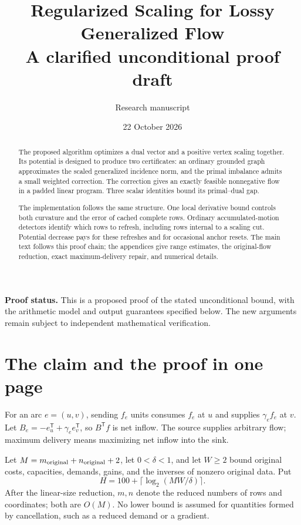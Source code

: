 \documentclass[11pt]{article}
\title{Regularized Scaling for Lossy Generalized Flow\\
\large A clarified unconditional proof draft}
\author{Research manuscript}
\date{22 October 2026}
\theoremstyle{definition}\newtheorem{definition}[theorem]{Definition}
\theoremstyle{remark}\newtheorem{remark}[theorem]{Remark}
\begin{document}
\maketitle
\begin{abstract}
The proposed algorithm optimizes a dual vector and a positive vertex
scaling together. Its potential is designed to produce two certificates:
an ordinary grounded graph approximates the scaled generalized incidence
norm, and the primal imbalance admits a small weighted correction.
The correction gives an exactly feasible nonnegative flow in a padded
linear program. Three scalar identities bound its primal--dual gap.

The implementation follows the same structure. One local derivative
bound controls both curvature and the error of cached complete rows.
Ordinary accumulated-motion detectors identify which rows to refresh,
including rows internal to a scaling cut. Potential decrease pays for
these refreshes and for occasional anchor resets. The main text follows
this proof chain; the appendices give range estimates, the original-flow
reduction, exact maximum-delivery repair, and numerical details.
\end{abstract}
\noindent\textbf{Proof status.} This is a proposed proof of the stated
unconditional bound, with the arithmetic model and output guarantees
specified below. The new arguments remain subject to independent
mathematical verification.
\setcounter{tocdepth}{1}
{\small\tableofcontents}
\newpage

\section{The claim and the proof in one page}

For an arc $e=(u,v)$, sending $f_e$ units consumes $f_e$ at $u$ and
supplies $\gamma_e f_e$ at $v$. Let
$B_e=-e_u^{\mathsf T}+\gamma_e e_v^{\mathsf T}$, so
$B^{\mathsf T}f$ is net inflow. The source supplies arbitrary flow;
maximum delivery means maximizing net inflow into the sink.

Let $M=m_{\rm original}+n_{\rm original}+2$, let $0<\delta<1$, and
let $W\ge2$ bound original costs, capacities, demands, gains, and the
inverses of nonzero original data. Put
\[
 H=100+\lceil\log_2(MW/\delta)\rceil.
\]
After the linear-size reduction, $m,n$ denote the reduced numbers of
rows and coordinates; both are $O(M)$. No lower bound is assumed for
quantities formed by cancellation, such as a reduced demand or a gradient.
\end{document}
